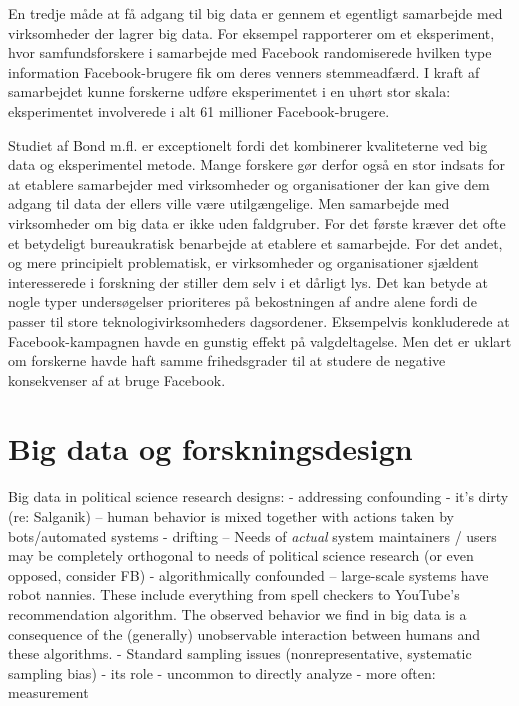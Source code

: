 \documentclass[12pt,]{article}
\begin{document}
En tredje måde at få adgang til big data er gennem et egentligt
samarbejde med virksomheder der lagrer big data. For eksempel
rapporterer \citet{bond2012} om et eksperiment, hvor samfundsforskere i
samarbejde med Facebook randomiserede hvilken type information
Facebook-brugere fik om deres venners stemmeadfærd. I kraft af
samarbejdet kunne forskerne udføre eksperimentet i en uhørt stor skala:
eksperimentet involverede i alt 61 millioner Facebook-brugere.

Studiet af Bond m.fl. er exceptionelt fordi det kombinerer kvaliteterne
ved big data og eksperimentel metode. Mange forskere gør derfor også en
stor indsats for at etablere samarbejder med virksomheder og
organisationer der kan give dem adgang til data der ellers ville være
utilgængelige. Men samarbejde med virksomheder om big data er ikke uden
faldgruber. For det første kræver det ofte et betydeligt bureaukratisk
benarbejde at etablere et samarbejde. For det andet, og mere principielt
problematisk, er virksomheder og organisationer sjældent interesserede i
forskning der stiller dem selv i et dårligt lys. Det kan betyde at nogle
typer undersøgelser prioriteres på bekostningen af andre alene fordi de
passer til store teknologivirksomheders dagsordener. Eksempelvis
konkluderede \citet{bond2012} at Facebook-kampagnen havde en gunstig
effekt på valgdeltagelse. Men det er uklart om forskerne havde haft
samme frihedsgrader til at studere de negative konsekvenser af at bruge
Facebook.

\hypertarget{big-data-og-forskningsdesign}{%
\section{Big data og
forskningsdesign}\label{big-data-og-forskningsdesign}}

Big data in political science research designs: - addressing confounding
- it's dirty (re: Salganik) -- human behavior is mixed together with
actions taken by bots/automated systems - drifting -- Needs of
\emph{actual} system maintainers / users may be completely orthogonal to
needs of political science research (or even opposed, consider FB) -
algorithmically confounded -- large-scale systems have robot nannies.
These include everything from spell checkers to YouTube's recommendation
algorithm. The observed behavior we find in big data is a consequence of
the (generally) unobservable interaction between humans and these
algorithms. - Standard sampling issues (nonrepresentative, systematic
sampling bias) - its role - uncommon to directly analyze - more often:
measurement
\end{document}
